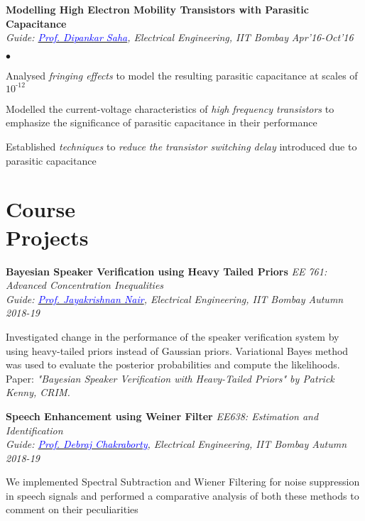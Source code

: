\documentclass[margin,line]{res}
\newenvironment{list1}{
  \begin{list}{\ding{113}}{%
      \setlength{\itemsep}{0in}
      \setlength{\parsep}{0in} \setlength{\parskip}{0in}
      \setlength{\topsep}{0in} \setlength{\partopsep}{0in} 
      \setlength{\leftmargin}{0.17in}}}{\end{list}}
\newenvironment{list2}{
  \begin{list}{$\bullet$}{%
      \setlength{\itemsep}{0.03in}
      \setlength{\parsep}{0in} \setlength{\parskip}{0in}
      \setlength{\topsep}{0in} \setlength{\partopsep}{0in} 
      \setlength{\leftmargin}{0.2in}}}{\end{list}}
\begin{document}
\begin{resume}
{\bf Modelling High Electron Mobility Transistors with Parasitic Capacitance} \\
{\em Guide: \href{https://www.ee.iitb.ac.in/wiki/faculty/dsaha}{\textcolor{blue}{Prof. Dipankar Saha}}, Electrical Engineering, IIT Bombay} \hfill {\it Apr'16-Oct'16}\\
\vspace*{-.13in}
\begin{list2}
\item Analysed \emph{fringing effects} to model the resulting parasitic capacitance at scales of $10^\text{-12}$ 
\item Modelled the current-voltage characteristics of \emph{high frequency transistors} to emphasize the significance of parasitic capacitance in their performance
\item Established \emph{techniques}  to \emph{reduce the  transistor switching delay} introduced due to parasitic capacitance
\end{list2}




\section{\sc Course \\ Projects}
{\bf Bayesian Speaker Verification using Heavy Tailed Priors} \hfill {\it EE 761: Advanced Concentration Inequalities} \\
{\em Guide: \href{https://www.ee.iitb.ac.in/~jayakrishnan.nair/}{\textcolor{blue}{Prof. Jayakrishnan Nair}}, Electrical Engineering, IIT Bombay \hfill Autumn 2018-19} \\
\vspace*{-.15in}
\begin{list1}
\item[] Investigated change in the performance of the speaker verification system by using heavy-tailed priors instead of Gaussian priors. Variational Bayes method was used to evaluate the posterior probabilities and compute the likelihoods. Paper: \textit{"Bayesian Speaker Verification with Heavy-Tailed Priors" by Patrick Kenny, CRIM.} 
\end{list1}


{\bf Speech Enhancement using Weiner Filter} \hfill \textit{EE638: Estimation and Identification} \\
{\em Guide: \href{https://www.ee.iitb.ac.in/wiki/faculty/dc}{\textcolor{blue}{Prof. Debraj Chakraborty}}, Electrical Engineering, IIT Bombay \hfill Autumn 2018-19} \\
\vspace*{-.15in}
\begin{list1}
\item[] We implemented Spectral Subtraction and Wiener Filtering for noise suppression in speech signals and performed a comparative analysis of both these methods to comment on their peculiarities
\end{list1}


\end{resume}
\end{document}
